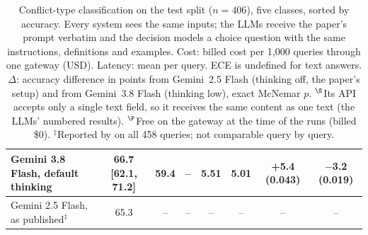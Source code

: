\begin{table}[t]
{\begin{tabular}{lccccccc}
\quad Gemini 3.8 Flash, default thinking & 66.7 [62.1, 71.2] & 59.4 & -- & 5.51 & 5.01 & +5.4 (0.043) & $-$3.2 (0.019) \\
\midrule
\quad Gemini 2.5 Flash, as published$^\ddagger$ & 65.3 & -- & -- & -- & -- & -- & -- \\
\bottomrule
\end{tabular}}
\caption{Conflict-type classification on the \conflicts test split ($n=406$), five classes, sorted by accuracy. Every system sees the same inputs; the LLMs receive the paper's prompt verbatim and the decision models a choice question with the same instructions, definitions and examples. Cost: billed cost per 1,000 queries through one gateway (USD). Latency: mean per query. ECE is undefined for text answers. $\Delta$: accuracy difference in points from Gemini~2.5 Flash (thinking off, the paper's setup) and from Gemini~3.8 Flash (thinking low), exact McNemar $p$. $^\S$Its API accepts only a single text field, so it receives the same content as one text (the LLMs' numbered results). $^\P$Free on the gateway at the time of the runs (billed \$0). $^\ddagger$Reported by \citet{cattan2025dragged} on all 458 queries; not comparable query by query.}
\label{tab:main}
\end{table}
